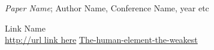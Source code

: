 \begin{thebibliography}{99}


\emph{Paper Name}; Author Name, Conference Name, year etc 


Link Name \\ \url{http://url link here}
\url{The-human-element-the-weakest}



\end{thebibliography}